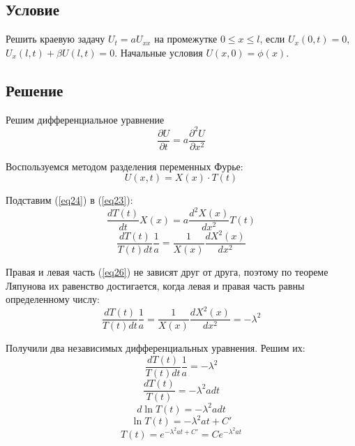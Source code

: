 \subsection{Условие}

Решить краевую задачу $U_t = aU_{xx}$ на промежутке $0 \leq x \leq l$, если $U_x(0, t) = 0$, $U_x(l, t) + \beta U(l, t) = 0$. Начальные условия $U(x, 0) = \phi(x)$.

\subsection{Решение}

Решим дифференциальное уравнение
\begin{equation}
    \label{eq23}
    \frac{\partial U}{\partial t} = a \frac{\partial^2 U}{\partial x^2}
\end{equation}

Воспользуемся методом разделения переменных Фурье:
\begin{equation}
    \label{eq24}
    U(x, t) = X(x) \cdot T(t)
\end{equation}

Подставим (\ref{eq24}) в (\ref{eq23}):
\begin{equation}
    \label{eq25}
    \frac{dT(t)}{dt} X(x) = a \frac{d^2 X(x)}{dx^2} T(t)
\end{equation}
\begin{equation}
    \label{eq26}
    \frac{dT(t)}{T(t) dt} \frac{1}{a} = \frac{1}{X(x)} \frac{dX^2(x)}{dx^2}
\end{equation}

Правая и левая часть (\ref{eq26}) не зависят друг от друга, поэтому по теореме Ляпунова их равенство достигается, когда левая и правая часть равны определенному числу:
\begin{equation}
    \label{eq27}
    \frac{dT(t)}{T(t) dt} \frac{1}{a} = \frac{1}{X(x)} \frac{dX^2(x)}{dx^2} = - \lambda^2
\end{equation}

Получили два независимых дифференциальных уравнения. Решим их:
\begin{equation}
    \label{eq28}
    \frac{dT(t)}{T(t) dt} \frac{1}{a} = - \lambda^2
\end{equation}
\begin{equation}
    \label{eq29}
    \frac{dT(t)}{T(t)} = - \lambda^2 a dt
\end{equation}
\begin{equation}
    \label{eq30}
    d \ln T(t) = - \lambda^2 a dt
\end{equation}
\begin{equation}
    \label{eq31}
    \ln T(t) = - \lambda^2 a t + C'
\end{equation}
\begin{equation}
    \label{eq32}
    T(t) = e^{- \lambda^2 a t + C'} = C e^{- \lambda^2 a t}
\end{equation}

